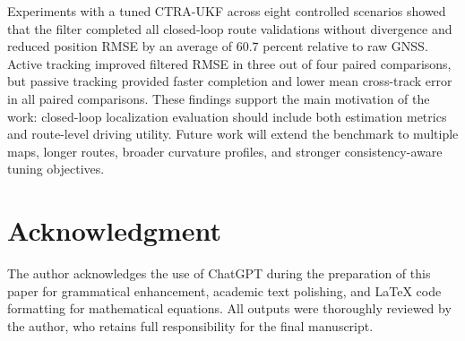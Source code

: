 \documentclass[conference]{IEEEtran}
\begin{document}
Experiments with a tuned CTRA-UKF across eight controlled scenarios showed that the filter completed all closed-loop route validations without divergence and reduced position RMSE by an average of 60.7 percent relative to raw GNSS. Active tracking improved filtered RMSE in three out of four paired comparisons, but passive tracking provided faster completion and lower mean cross-track error in all paired comparisons. These findings support the main motivation of the work: closed-loop localization evaluation should include both estimation metrics and route-level driving utility. Future work will extend the benchmark to multiple maps, longer routes, broader curvature profiles, and stronger consistency-aware tuning objectives.


\section*{Acknowledgment}
The author acknowledges the use of ChatGPT during the preparation of this paper for grammatical enhancement, academic text polishing, and LaTeX code formatting for mathematical equations. All outputs were thoroughly reviewed by the author, who retains full responsibility for the final manuscript.



\end{document}
